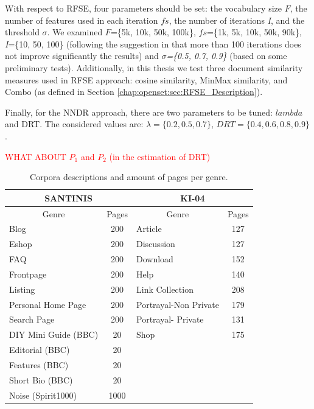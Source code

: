 With respect to RFSE, four parameters should be set: the vocabulary size $F$, the number of features used in each iteration $fs$, the number of iterations \textit{I}, and the threshold $\sigma$. We examined $F$=\{5k, 10k, 50k, 100k\}, $fs$=\{1k, 5k, 10k, 50k, 90k\}, \textit{I}=\{10, 50, 100\} (following the suggestion in \parencite{koppel2011authorship} that more than 100 iterations does not improve significantly the results) and $\sigma$\textit{=\{0.5, 0.7, 0.9\}} (based on some preliminary tests). Additionally, in this thesis we test three document similarity measures used in RFSE approach: cosine similarity, MinMax similarity, and Combo (as defined in Section \ref{chap:openset:sec:RFSE_Description}). 

Finally, for the NNDR approach, there are two parameters to be tuned: $lambda$ and DRT. The considered values are: $\lambda =\{0.2, 0.5, 0.7\}$, $DRT=\{0.4, 0.6, 0.8, 0.9\}$. 

\textcolor{red}{WHAT ABOUT $P_1$ and $P_2$ (in the estimation of DRT)}

\begin{table}[t]
\center
\begin{tabular}{|l|l|l|l|}
\hline
\multicolumn{2}{|c|}{SANTINIS} & \multicolumn{2}{c|}{KI-04}\tabularnewline
\hline
\multicolumn{1}{|c|}{Genre} & \multicolumn{1}{c|}{Pages} & \multicolumn{1}{c|}{Genre} & \multicolumn{1}{c|}{Pages}\tabularnewline
\hline
\multicolumn{1}{|l|}{Blog} & \multicolumn{1}{c|}{200} & \multicolumn{1}{l|}{Article} & \multicolumn{1}{c|}{127}\tabularnewline
\multicolumn{1}{|l|}{Eshop} & \multicolumn{1}{c|}{200} & \multicolumn{1}{l|}{Discussion} & \multicolumn{1}{c|}{127}\tabularnewline
\multicolumn{1}{|l|}{FAQ} & \multicolumn{1}{c|}{200} & \multicolumn{1}{l|}{Download} & \multicolumn{1}{c|}{152}\tabularnewline
\multicolumn{1}{|l|}{Frontpage} & \multicolumn{1}{c|}{200} & \multicolumn{1}{l|}{Help} & \multicolumn{1}{c|}{140}\tabularnewline
\multicolumn{1}{|l|}{Listing} & \multicolumn{1}{c|}{200} & \multicolumn{1}{l|}{Link Collection} & \multicolumn{1}{c|}{208}\tabularnewline
\multicolumn{1}{|l|}{Personal Home Page} & \multicolumn{1}{c|}{200} & \multicolumn{1}{l|}{Portrayal-Non Private} & \multicolumn{1}{c|}{179}\tabularnewline
\multicolumn{1}{|l|}{Search Page} & \multicolumn{1}{c|}{200} & \multicolumn{1}{l|}{Portrayal- Private} & \multicolumn{1}{c|}{131}\tabularnewline
\multicolumn{1}{|l|}{DIY Mini Guide (BBC)} & \multicolumn{1}{c|}{20} & \multicolumn{1}{l|}{Shop} & \multicolumn{1}{c|}{175}\tabularnewline
\multicolumn{1}{|l|}{Editorial (BBC)} & \multicolumn{1}{c|}{20} &  & \tabularnewline
\multicolumn{1}{|l|}{Features (BBC)} & \multicolumn{1}{c|}{20} &  & \tabularnewline
\multicolumn{1}{|l|}{Short Bio (BBC)} & \multicolumn{1}{c|}{20} &  & \tabularnewline
\multicolumn{1}{|l|}{Noise (Spirit1000)} & \multicolumn{1}{c|}{1000} &  & \tabularnewline
\hline
\end{tabular}
\caption {Corpora descriptions and amount of pages per genre.}
\label{chap:noise:tbl:genre_tags}
\end{table}


